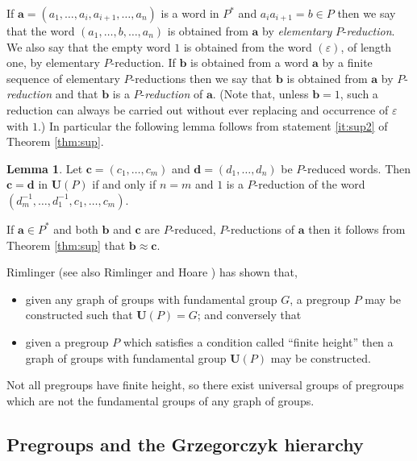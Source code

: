 \documentclass[a4paper]{article}
\newcommand\eps{\varepsilon}
\newcommand{\avec}{\mathbf{a}}	%
\newcommand{\bvec}{\mathbf{b}}	%
\newcommand{\cvec}{\mathbf{c}}	%
\newcommand{\dvec}{\mathbf{d}}	%
\newcommand{\Uvec}{\mathbf{U}}	%
\newcommand{\UP}{\Uvec(P)}
\theoremstyle{plain}
\theoremstyle{definition}
\newtheorem{lemma}[theorem]{Lemma}
\begin{document}
If $\avec=(a_1,\ldots, a_i,a_{i+1},\ldots, a_n)$ is a word in $P^*$ and $a_ia_{i+1}=b\in P$ then
we say that the word  $(a_1,\ldots, b ,\ldots, a_n)$ is obtained from $\avec$ by
\emph{elementary} $P$-\emph{reduction}. We also say that the empty word $1$ is obtained from the 
word $(\eps)$, of length one, by elementary $P$-reduction. If $\bvec$ is obtained from a word $\avec$
 by a finite sequence of elementary $P$-reductions then we say that $\bvec$ is obtained from $\avec$
by $P$-\emph{reduction} and that $\bvec$ is a $P$-\emph{reduction} of $\avec$.  
(Note that, unless $\bvec=1$,  such a reduction can always be carried out without ever
replacing and occurrence of $\eps$ with $1$.) 
In particular the following lemma follows from statement \ref{it:sup2} of Theorem \ref{thm:sup}.
\begin{lemma}\label{lem:interleave}
Let $\cvec=(c_1,\ldots , c_m)$ and $\dvec=(d_1,\ldots, d_n)$ be $P$-reduced words. Then 
$\cvec=\dvec$ in $\UP$  if and only if $n=m$ and $1$ is a $P$-reduction of the word
$(d_m^{-1},\ldots, d_1^{-1},c_1,\ldots , c_m)$. 
\end{lemma}

If $\avec \in P^\ast$ and both $\bvec$ and $\cvec$ are $P$-reduced, $P$-reductions of $\avec$ then
it follows from Theorem \ref{thm:sup} that $\bvec\approx \cvec$. 

Rimlinger \cite{Rimlinger_1987a} (see also Rimlinger \cite{Rimlinger_1987b} and Hoare \cite{Hoare_1988}) 
has shown that, 
\begin{itemize}
\item given any graph of groups with fundamental group $G$, a pregroup $P$ may
be constructed such that $\UP = G$;  and conversely that
\item  given a pregroup $P$ which satisfies a condition called ``finite height'' then a graph
of groups with fundamental group $\UP$ may be constructed.
\end{itemize}
Not all pregroups have finite height, so there exist universal groups of pregroups which
are not  the fundamental groups of any  graph of groups. 

\subsection{Pregroups and the Grzegorczyk hierarchy}
\end{document}
